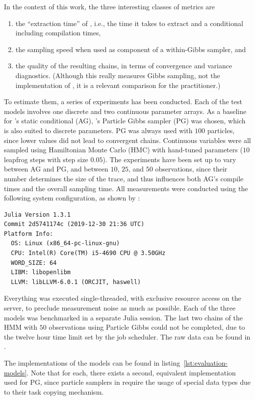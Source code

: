 In the context of this work, the three interesting classes of metrics are
\begin{enumerate}
  \firmlist
\item the \enquote{extraction time} of \autogibbsjl{}, i.e., the time it takes to extract and a
  conditional including compilation times,
\item the sampling speed when used as component of a within-Gibbs sampler, and
\item the quality of the resulting chains, in terms of convergence and variance diagnostics.
  (Although this really measures Gibbs sampling, not the implementation of \autogibbsjl{}, it is a
  relevant comparison for the practitioner.)
\end{enumerate}
To estimate them, a series of experiments has been conducted.  Each of the test models involves one
discrete and two continuous parameter arrays.  As a baseline for \autogibbsjl{}'s static conditional
(AG), \turingjl{}'s Particle Gibbs sampler (PG) was chosen, which is also suited to discrete
parameters.  PG was always used with \(100\) particles, since lower values did not lead to
convergent chains.  Continuous variables were all sampled using Hamiltonian Monte Carlo (HMC) with
hand-tuned parameters (\(10\) leapfrog steps with step size \(0.05\)).  The experiments have been
set up to vary between AG and PG, and between \(10\), \(25\), and \(50\) observations, since their
number determines the size of the trace, and thus influences both AG's compile times and the overall
sampling time.  All measurements were conducted using the following system configuration, as shown
by :
\begin{lstlisting}
Julia Version 1.3.1
Commit 2d5741174c (2019-12-30 21:36 UTC)
Platform Info:
  OS: Linux (x86_64-pc-linux-gnu)
  CPU: Intel(R) Core(TM) i5-4690 CPU @ 3.50GHz
  WORD_SIZE: 64
  LIBM: libopenlibm
  LLVM: libLLVM-6.0.1 (ORCJIT, haswell)
\end{lstlisting}
Everything was executed single-threaded, with exclusive resource access on the server, to preclude
measurement noise as much as possible.  Each of the three models was benchmarked in a separate Julia
session.  The last two chains of the HMM with \(50\) observations using Particle Gibbs could not be
completed, due to the twelve hour time limit set by the job scheduler.  The raw data can be found in
\textcite{gabler2020mcmc}. 

The \dppljl{} implementations of the models can be found in listing~\ref{lst:evaluation-models}.
Note that for each, there exists a second, equivalent implementation used for PG, since particle
samplers in \turingjl{} require the usage of special data types due to their task copying mechanism.

